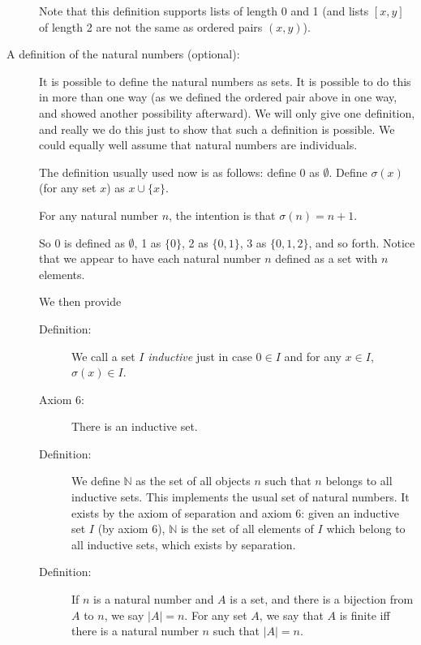 \documentclass[12pt]{article}
\begin{document}
\begin{description}
Note that this definition supports lists of length 0 and 1 (and lists $[x,y]$ of length 2 are not the same as ordered pairs $(x,y)$).

\item[A definition of the natural numbers (optional):]

It is possible to define the natural numbers as sets.  It is possible to do this in more than one way (as we defined the ordered pair above in one way, and showed another possibility afterward).  We will only give one definition, and really we do this just to show that such a definition is possible.  We could equally well assume that natural numbers are individuals.

The definition usually used now is as follows:  define 0 as $\emptyset$.  Define $\sigma(x)$ (for any set $x$) as $x \cup \{x\}$.

For any natural number $n$, the intention is that $\sigma(n)=n+1$.

So 0 is defined as $\emptyset$, 1 as $\{0\}$, 2 as $\{0,1\}$, 3 as $\{0,1,2\}$, and so forth.   Notice that we appear to have each natural number $n$ defined as a set with $n$ elements.

We then provide 


\begin{description}


\item[Definition:]  We call a set $I$ {\em inductive\/} just in case $0 \in I$ and for any $x \in I$, $\sigma(x) \in I$.

\item[Axiom 6:]  There is an inductive set.

\item[Definition:]  We define $\mathbb N$ as the set of all objects $n$ such that $n$ belongs to all inductive sets.  This implements the usual set of natural numbers.
It exists by the axiom of separation and axiom 6:  given an inductive set $I$ (by axiom 6), $\mathbb N$ is the set of all elements of $I$ which belong to all inductive sets, which exists by separation.

\item[Definition:]  If $n$ is a natural number and $A$ is a set, and there is a bijection from $A$ to $n$, we say $|A|=n$.  For any set $A$, we say that $A$ is finite iff
there is a natural number $n$ such that $|A|=n$.

\end{description}







\end{description}
\end{document}
